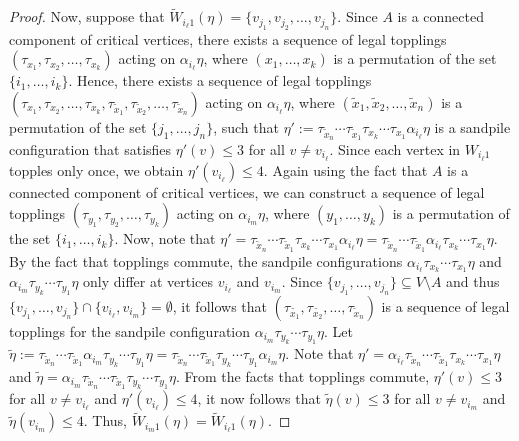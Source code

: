 \documentclass{article}
\begin{document}
\begin{proof}
    Now, suppose that $\tilde{W}_{i_{\ell}1}(\eta) = \{v_{j_1}, v_{j_2}, \ldots, v_{j_n}\}$. Since $A$ is a connected component of critical vertices, there exists a sequence of legal topplings $(\tau_{x_1}, \tau_{x_2}, \ldots, \tau_{x_k})$ acting on $\alpha_{i_{\ell}}\eta$, where $(x_1, \ldots, x_k)$ is a permutation of the set $\{i_1, \ldots, i_k\}$. Hence, there exists a sequence of legal topplings $(\tau_{x_1}, \tau_{x_2}, \ldots, \tau_{x_k}, \tau_{\tilde{x}_1}, \tau_{\tilde{x}_2}, \ldots, \tau_{\tilde{x}_n})$ acting on $\alpha_{i_{\ell}} \eta$, where $(\tilde{x}_1, \tilde{x}_2, \ldots, \tilde{x}_n)$ is a permutation of the set $\{j_1, \ldots, j_n\}$, such that $\eta' := \tau_{\tilde{x}_n} \cdots \tau_{\tilde{x}_1} \tau_{x_k} \cdots \tau_{x_1} \alpha_{i_{\ell}} \eta$ is a sandpile configuration that satisfies $\eta'(v) \leq 3$ for all $v \neq v_{i_{\ell}}$. Since each vertex in $W_{i_{\ell}1}$ topples only once, we obtain $\eta'(v_{i_{\ell}}) \leq 4$. Again using the fact that $A$ is a connected component of critical vertices, we can construct a sequence of legal topplings $(\tau_{y_1}, \tau_{y_2}, \ldots, \tau_{y_k})$ acting on $\alpha_{i_m} \eta$, where $(y_1, \ldots, y_k)$ is a permutation of the set $\{i_1, \ldots, i_k\}$. Now, note that $\eta' = \tau_{\tilde{x}_n} \cdots \tau_{\tilde{x}_1} \tau_{x_k} \cdots \tau_{x_1} \alpha_{i_{\ell}} \eta = \tau_{\tilde{x}_n} \cdots \tau_{\tilde{x}_1} \alpha_{i_{\ell}} \tau_{x_k} \cdots \tau_{x_1} \eta$. By the fact that topplings commute, the sandpile configurations $\alpha_{i_{\ell}} \tau_{x_k} \cdots \tau_{x_1} \eta$ and $\alpha_{i_m} \tau_{y_k} \cdots \tau_{y_1}\eta$ only differ at vertices $v_{i_{\ell}}$ and $v_{i_m}$. Since $\{v_{j_1}, \ldots, v_{j_n}\} \subseteq V \setminus A$ and thus $\{v_{j_1}, \ldots, v_{j_n}\} \cap \{v_{i_{\ell}}, v_{i_m}\} = \emptyset$, it follows that $(\tau_{\tilde{x_1}}, \tau_{\tilde{x_2}}, \ldots, \tau_{\tilde{x}_n})$ is a sequence of legal topplings for the sandpile configuration $\alpha_{i_m} \tau_{y_k} \cdots \tau_{y_1} \eta$. Let $\tilde{\eta} := \tau_{\tilde{x}_n} \cdots \tau_{\tilde{x}_1} \alpha_{i_m} \tau_{y_k} \cdots \tau_{y_1} \eta =  \tau_{\tilde{x}_n} \cdots \tau_{\tilde{x}_1} \tau_{y_k} \cdots \tau_{y_1} \alpha_{i_m} \eta$. Note that $\eta' = \alpha_{i_{\ell}} \tau_{\tilde{x}_n} \cdots \tau_{\tilde{x}_1} \tau_{x_k} \cdots \tau_{x_1} \eta$ and $\tilde{\eta} = \alpha_{i_m} \tau_{\tilde{x}_n} \cdots \tau_{\tilde{x}_1} \tau_{y_k} \cdots \tau_{y_1} \eta$. From the facts that topplings commute, $\eta'(v) \leq 3$ for all $v \neq v_{i_{\ell}}$ and $\eta'(v_{i_{\ell}}) \leq 4$, it now follows that $\tilde{\eta}(v) \leq 3$ for all $v \neq v_{i_m}$ and $\tilde{\eta}(v_{i_m}) \leq 4$. Thus, $\tilde{W}_{i_m1}(\eta) = \tilde{W}_{i_{\ell}1}(\eta)$. 
\end{proof}
\end{document}
